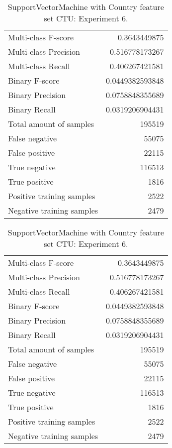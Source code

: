 \begin{table}[H]
\begin{minipage}{0.5\textwidth}
\caption{SupportVectorMachine with Country feature set CTU: Experiment 5.}
\centering
\begin{tabular}{l r}
\toprule
Multi-class F-score & 0.3643449875 \\
Multi-class Precision & 0.516778173267 \\
Multi-class Recall & 0.406267421581 \\
\midrule
Binary F-score & 0.0449382593848 \\
Binary Precision & 0.0758848355689 \\
Binary Recall & 0.0319206904431 \\
\midrule
Total amount of samples & 195519 \\
False negative & 55075 \\
False positive & 22115 \\
True negative & 116513 \\
True positive & 1816 \\
\midrule
Positive training samples & 2522 \\
Negative training samples & 2479 \\
\bottomrule
\end{tabular}
\end{minipage}
\hfillx
\begin{minipage}{0.5\textwidth}
\caption{SupportVectorMachine with Country feature set CTU: Experiment 6.}
\centering
\begin{tabular}{l r}
\toprule
Multi-class F-score & 0.3643449875 \\
Multi-class Precision & 0.516778173267 \\
Multi-class Recall & 0.406267421581 \\
\midrule
Binary F-score & 0.0449382593848 \\
Binary Precision & 0.0758848355689 \\
Binary Recall & 0.0319206904431 \\
\midrule
Total amount of samples & 195519 \\
False negative & 55075 \\
False positive & 22115 \\
True negative & 116513 \\
True positive & 1816 \\
\midrule
Positive training samples & 2522 \\
Negative training samples & 2479 \\
\bottomrule
\end{tabular}
\end{minipage}
\end{table}
